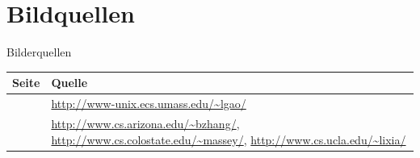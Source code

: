 \documentclass[ngerman,compress,hyperref={bookmarks}]{beamer}
\begin{document}
\section{Bildquellen}
\begin{frame}[plain]{Bilderquellen}
\scriptsize
\begin{table}
\begin{tabular}{ c p{} }
Seite & Quelle \\ \hline
\pageref{gao} & \url{http://www-unix.ecs.umass.edu/~lgao/} \\
\pageref{zhang_et_al} & \url{http://www.cs.arizona.edu/~bzhang/}, \url{http://www.cs.colostate.edu/~massey/}, \url{http://www.cs.ucla.edu/~lixia/}\\
\hline
\end{tabular}
\end{table}
\end{frame}
\end{document}
